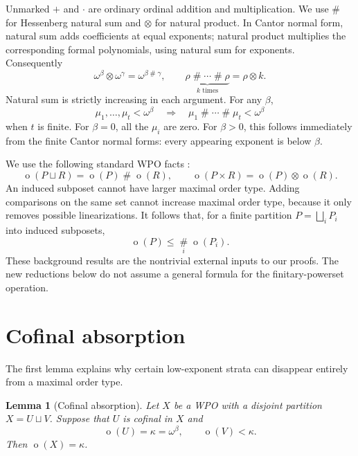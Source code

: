 \documentclass[11pt,a4paper]{article}
\newtheorem{lemma}[theorem]{Lemma}
\theoremstyle{definition}
\theoremstyle{remark}
\newcommand{\ot}{\operatorname{o}}
\newcommand{\ns}{\mathbin{\#}}
\newcommand{\bigns}{\mathop{\#}\limits}
\newcommand{\np}{\mathbin{\otimes}}
\begin{document}
Unmarked $+$ and $\cdot$ are ordinary ordinal addition and multiplication.
We use $\ns$ for Hessenberg natural sum and $\np$ for natural product. In
Cantor normal form, natural sum adds coefficients at equal exponents;
natural product multiplies the corresponding formal polynomials, using
natural sum for exponents. Consequently
\begin{equation}\label{eq:pureproduct}
 \omega^\beta\np\omega^\gamma=\omega^{\beta\ns\gamma},
 \qquad
 \underbrace{\rho\ns\cdots\ns\rho}_{k\text{ times}}=\rho\np k.
\end{equation}
Natural sum is strictly increasing in each argument. For any $\beta$,
\begin{equation}\label{eq:closure}
 \mu_1,\ldots,\mu_t<\omega^\beta
 \quad\Longrightarrow\quad
 \mu_1\ns\cdots\ns\mu_t<\omega^\beta
\end{equation}
when $t$ is finite. For $\beta=0$, all the $\mu_i$ are zero. For $\beta>0$,
this follows immediately from the finite Cantor normal forms: every
appearing exponent is below $\beta$.

We use the following standard WPO facts
\cite{deJonghParikh1977,DSS2020}:
\begin{equation}\label{eq:standard}
 \ot(P\sqcup R)=\ot(P)\ns\ot(R),
 \qquad
 \ot(P\times R)=\ot(P)\np\ot(R).
\end{equation}
An induced subposet cannot have larger maximal order type. Adding
comparisons on the same set cannot increase maximal order type, because it
only removes possible linearizations. It follows that, for a finite
partition $P=\bigsqcup_i P_i$ into induced subposets,
\begin{equation}\label{eq:partitionbound}
 \ot(P)\le\bigns_i\ot(P_i).
\end{equation}
These background results are the nontrivial external inputs to our proofs.
The new reductions below do not assume a general formula for the
finitary-powerset operation.

\section{Cofinal absorption}\label{sec:absorption}

The first lemma explains why certain low-exponent strata can disappear
entirely from a maximal order type.

\begin{lemma}[Cofinal absorption]\label{lem:absorption}
Let $X$ be a WPO with a disjoint partition $X=U\sqcup V$. Suppose that $U$
is cofinal in $X$ and
\[
 \ot(U)=\kappa=\omega^\beta,
 \qquad \ot(V)<\kappa.
\]
Then $\ot(X)=\kappa$.
\end{lemma}
\end{document}
